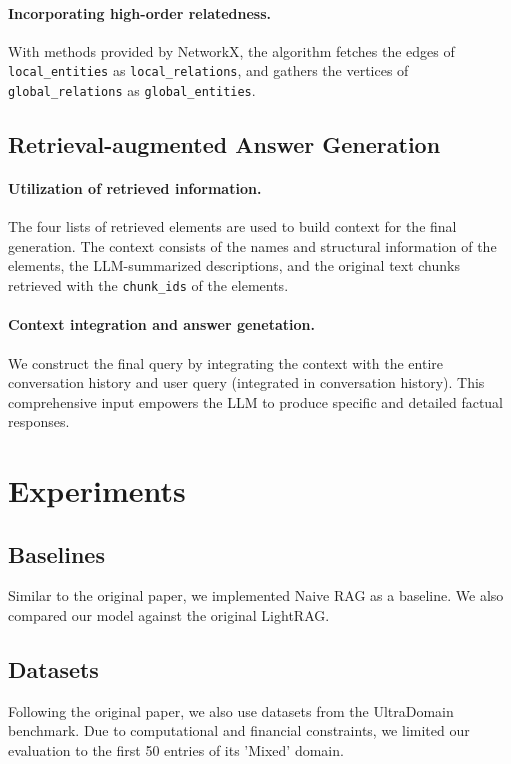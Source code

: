 \documentclass{article}
\begin{document}
    \paragraph{Incorporating high-order relatedness.}
        With methods provided by NetworkX,
        the algorithm fetches the edges of \verb|local_entities| as \verb|local_relations|,
        and gathers the vertices of \verb|global_relations| as \verb|global_entities|.
  
  \subsection{Retrieval-augmented Answer Generation}

    \paragraph{Utilization of retrieved information.}
        The four lists of retrieved elements are used to build context for the final generation.
        The context consists of the names and structural information of the elements,
        the LLM-summarized descriptions,
        and the original text chunks retrieved with the \verb|chunk_ids| of the elements.

    \paragraph{Context integration and answer genetation.}
        We construct the final query by integrating the context with the entire conversation history and user query (integrated in conversation history).
        This comprehensive input empowers the LLM to produce specific and detailed factual responses.



\section{Experiments}
  \subsection{Baselines}
    Similar to the original paper, we implemented Naive RAG as a baseline\cite{gao2023precise}.
    We also compared our model against the original LightRAG.

  \subsection{Datasets}
    Following the original paper, 
    we also use datasets from the UltraDomain benchmark\cite{qian2024memorag}. 
    Due to computational and financial constraints,
    we limited our evaluation to the first 50 entries of its 'Mixed' domain.
\end{document}
